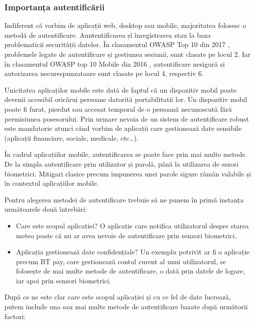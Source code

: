 \documentclass[12pt]{article}
\begin{document}
\subsubsection{Importanța autentificării}

Indiferent că vorbim de aplicații web, desktop sau mobile, majoritatea folosesc 
o metodă de autentificare. Auntentificarea șî înregistrarea stau la baza
problematicii securității datelor. În clasamentul OWASP Top 10 din 2017 \cite{owasp-top10-2017}, 
problemele legate de autentificare și gestiunea sesiunii, sunt clasate pe locul 2. Iar în
clasamentul OWASP top 10 Mobile din 2016 \cite{owasp-top10-mobile}, autentificare nesigură
și autorizarea necurespunzatoare sunt clasate pe locul 4, respectiv 6.

Unicitatea aplicaților mobile este dată de faptul că un dispozitiv mobil
poate devenii accesibil oricărui persoane datorită portabilitatii lor. Un dispozitiv mobil
poate fi furat, pierdut sau accesat temporal de o persoană necunoscută fără permisiunea
posesorului. Prin urmare nevoia de un sistem de autentificare robust este mandatorie 
atunci când vorbim de aplicații care gestionează date sensibile (aplicații financiare, sociale,
medicale, etc\dots).

\bigskip

În cadrul aplicațiilor mobile, autentificarea se poate face prin mai multe metode. De la
simpla autentificare prin utilizator și parolă, până la utilizarea de sezori biometrici.
Mitigari clasice precum impunerea unei parole sigure rămân valabile și în 
contextul aplicațiilor mobile.


Pentru alegerea metodei de autentificare trebuie să ne punem în primă instanța următoarele două
întrebări:

\begin{itemize}
    \item Care este scopul aplicației? O aplicație care notifica utilizatorul despre starea meteo poate 
    că nu ar avea nevoie de autentificare prin senzori biometrici. 
    \item Aplicația gestionează date confidențiale? Un exemplu potrivit ar fi o aplicație precum BT pay, care gestionează 
    contul curent al unui utilizatorul,
    se folosește de mai multe metode de autentificare, o dată prin datele de logare, iar apoi
    prin senzori biometrici.
\end{itemize}

După ce ne este clar care este scopul aplicației și cu ce fel de date lucrează, 
putem include una sau mai multe metode de autentificare bazate după următorii
factori:
\end{document}

